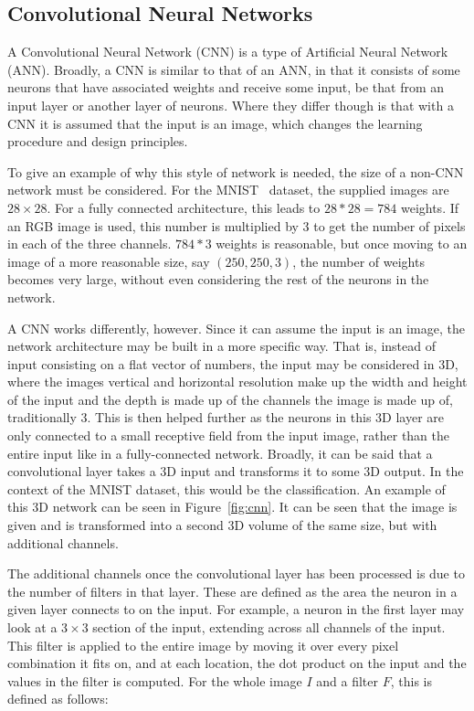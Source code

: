 \subsection{Convolutional Neural Networks}

A Convolutional Neural Network (CNN) is a type of Artificial Neural Network
(ANN). Broadly, a CNN is similar to that of an ANN, in that it consists of some
neurons that have associated weights and receive some input, be that from an
input layer or another layer of neurons. Where they differ though is that with a
CNN it is assumed that the input is an image, which changes the learning
procedure and design principles.

To give an example of why this style of network is needed, the size of a non-CNN
network must be considered. For the MNIST~\cite{lecun2010mnist} dataset, the
supplied images are $28 \times 28$. For a fully connected architecture, this
leads to $28 * 28 = 784$ weights. If an RGB image is used, this number is
multiplied by 3 to get the number of pixels in each of the three channels. $784
* 3$ weights is reasonable, but once moving to an image of a more reasonable
size, say $(250, 250, 3)$, the number of weights becomes very large, without
even considering the rest of the neurons in the network.

A CNN works differently, however. Since it can assume the input is an image, the
network architecture may be built in a more specific way. That is, instead of
input consisting on a flat vector of numbers, the input may be considered in 3D,
where the images vertical and horizontal resolution make up the width and height
of the input and the depth is made up of the channels the image is made up of,
traditionally 3. This is then helped further as the neurons in this 3D layer are
only connected to a small receptive field from the input image, rather than the
entire input like in a fully-connected network. Broadly, it can be said that a
convolutional layer takes a 3D input and transforms it to some 3D output. In the
context of the MNIST dataset, this would be the classification. An example of
this 3D network can be seen in Figure~\ref{fig:cnn}. It can be seen that the
image is given and is transformed into a second 3D volume of the same size, but
with additional channels.

The additional channels once the convolutional layer has been processed is due
to the number of filters in that layer. These are defined as the area the neuron
in a given layer connects to on the input. For example, a neuron in the first
layer may look at a $3 \times 3$ section of the input, extending across all
channels of the input. This filter is applied to the entire image by moving it
over every pixel combination it fits on, and at each location, the dot product
on the input and the values in the filter is computed. For the whole image $I$
and a filter $F$, this is defined as follows:

